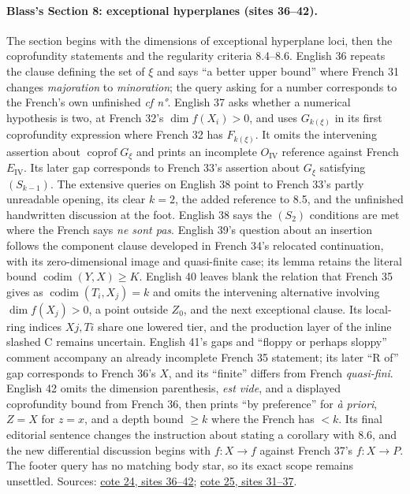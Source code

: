 \documentclass[10pt,a4paper]{article}
\begin{document}
\paragraph{Blass's Section 8: exceptional hyperplanes (sites 36--42).}
The section begins with the dimensions of exceptional hyperplane loci, then the coprofundity statements and the regularity criteria 8.4--8.6. English 36 repeats the clause defining the set of $\xi$ and says ``a better upper bound'' where French 31 changes \emph{majoration} to \emph{minoration}; the query asking for a number corresponds to the French's own unfinished \emph{cf n°}. English 37 asks whether a numerical hypothesis is two, at French 32's $\dim f(X_i)>0$, and uses $G_{k(\xi)}$ in its first coprofundity expression where French 32 has $F_{k(\xi)}$. It omits the intervening assertion about $\operatorname{coprof}G_\xi$ and prints an incomplete $O_{\mathrm{IV}}$ reference against French $E_{\mathrm{IV}}$. Its later gap corresponds to French 33's assertion about $G_\xi$ satisfying $(S_{k-1})$. The extensive queries on English 38 point to French 33's partly unreadable opening, its clear $k=2$, the added reference to 8.5, and the unfinished handwritten discussion at the foot. English 38 says the $(S_2)$ conditions are met where the French says \emph{ne sont pas}. English 39's question about an insertion follows the component clause developed in French 34's relocated continuation, with its zero-dimensional image and quasi-finite case; its lemma retains the literal bound $\operatorname{codim}(Y,X)\geq K$. English 40 leaves blank the relation that French 35 gives as $\operatorname{codim}(T_i,X_j)=k$ and omits the intervening alternative involving $\dim f(X_j)>0$, a point outside $Z_0$, and the next exceptional clause. Its local-ring indices $Xj,Ti$ share one lowered tier, and the production layer of the inline slashed C remains uncertain. English 41's gaps and ``floppy or perhaps sloppy'' comment accompany an already incomplete French 35 statement; its later ``R of'' gap corresponds to French 36's $X$, and its ``finite'' differs from French \emph{quasi-fini}. English 42 omits the dimension parenthesis, \emph{est vide}, and a displayed coprofundity bound from French 36, then prints ``by preference'' for \emph{à priori}, $Z=X$ for $z=x$, and a depth bound $\geq k$ where the French has $<k$. Its final editorial sentence changes the instruction about stating a corollary with 8.6, and the new differential discussion begins with $f:X\to f$ against French 37's $f:X\to P$. The footer query has no matching body star, so its exact scope remains unsettled. Sources: \href{https://grothendieck.umontpellier.fr/web/viewer.html?file=../24.pdf\#page=37}{cote 24, sites 36--42}; \href{https://grothendieck.umontpellier.fr/web/viewer.html?file=../25.pdf\#page=32}{cote 25, sites 31--37}.
\end{document}
